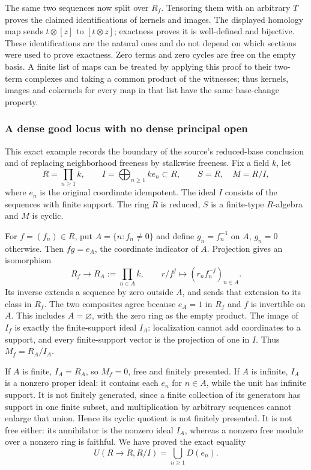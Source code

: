 The same two sequences now split over \(R_f\). Tensoring them with an arbitrary \(T\) proves the claimed identifications of kernels and images. The displayed homology map sends \(t\otimes[z]\) to \([t\otimes z]\); exactness proves it is well-defined and bijective. These identifications are the natural ones and do not depend on which sections were used to prove exactness. Zero terms and zero cycles are free on the empty basis. A finite list of maps can be treated by applying this proof to their two-term complexes and taking a common product of the witnesses; thus kernels, images and cokernels for every map in that list have the same base-change property.

\subsubsection{A dense good locus with no dense principal open}\label{a-dense-good-locus-with-no-dense-principal-open}

This exact example records the boundary of the source's reduced-base conclusion and of replacing neighborhood freeness by stalkwise freeness. Fix a field \(k\), let \[
 R=\prod_{n\ge1}k,\qquad I=\bigoplus_{n\ge1} k e_n\subset R,\qquad
 S=R,\quad M=R/I,
\] where \(e_n\) is the original coordinate idempotent. The ideal \(I\) consists of the sequences with finite support. The ring \(R\) is reduced, \(S\) is a finite-type \(R\)-algebra and \(M\) is cyclic.

For \(f=(f_n)\in R\), put \(A=\{n:f_n\ne0\}\) and define \(g_n=f_n^{-1}\) on \(A\), \(g_n=0\) otherwise. Then \(fg=e_A\), the coordinate indicator of \(A\). Projection gives an isomorphism \[
 R_f\longrightarrow R_A:=\prod_{n\in A}k,\qquad
 r/f^j\longmapsto (r_n f_n^{-j})_{n\in A}.
\] Its inverse extends a sequence by zero outside \(A\), and sends that extension to its class in \(R_f\). The two composites agree because \(e_A=1\) in \(R_f\) and \(f\) is invertible on \(A\). This includes \(A=\varnothing\), with the zero ring as the empty product. The image of \(I_f\) is exactly the finite-support ideal \(I_A\): localization cannot add coordinates to a support, and every finite-support vector is the projection of one in \(I\). Thus \(M_f=R_A/I_A\).

If \(A\) is finite, \(I_A=R_A\), so \(M_f=0\), free and finitely presented. If \(A\) is infinite, \(I_A\) is a nonzero proper ideal: it contains each \(e_n\) for \(n\in A\), while the unit has infinite support. It is not finitely generated, since a finite collection of its generators has support in one finite subset, and multiplication by arbitrary sequences cannot enlarge that union. Hence its cyclic quotient is not finitely presented. It is not free either: its annihilator is the nonzero ideal \(I_A\), whereas a nonzero free module over a nonzero ring is faithful. We have proved the exact equality \[
 U(R\to R,R/I)=\bigcup_{n\ge1}D(e_n).
\]

